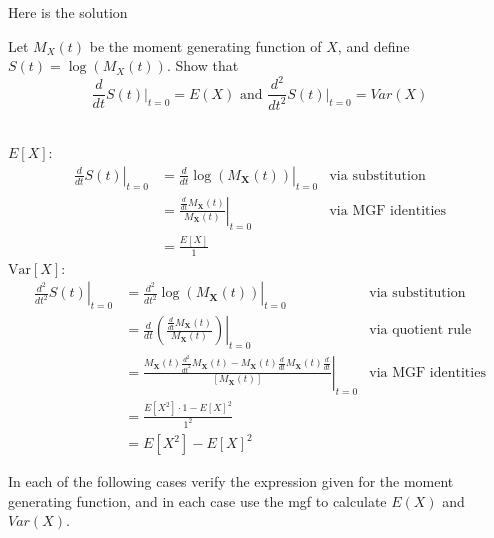 \documentclass[12pt,letterpaper]{exam}
\begin{document}
\begin{questions}
	
	\begin{solution}
		Here is the solution
	\end{solution}
	
	\setcounter{question}{31}
	\question  Let $M_X(t)$ be the moment generating function of $X$, and define $S(t) = \log{(M_X(t))}$. Show that
	$$ \frac{d}{dt} \left. S(t) \right|_{t=0} = E(X) \text{ and }  \frac{d^2}{dt^2} \left. S(t) \right|_{t=0} = Var(X)$$
	\begin{solution} \\
		\(E[X]\):
		\begin{align*}
			\left. \frac{d}{dt}S(t) \right|_{t=0} &= \left. \frac{d}{dt}\log(M_\mathbf{X}(t)) \right|_{t=0} &\text{via substitution}\\
			&= \left. \frac{\frac{d}{dt}M_\mathbf{X}(t)}{M_\mathbf{X}(t)} \right|_{t=0} &\text{via MGF identities} \\
			&= \frac{E[X]}{1}
		\end{align*}
		\(\text{Var}[X]\):
		\begin{align*}
			\left. \frac{d^2}{dt^2}S(t) \right|_{t=0} &= \left. \frac{d^2}{dt^2}\log(M_\mathbf{X}(t)) \right|_{t=0} &\text{via substitution}\\
			&= \left. \frac{d}{dt} \left( \frac{\frac{d}{dt}M_\mathbf{X}(t)}{M_\mathbf{X}(t)} \right) \right|_{t=0} &\text{via quotient rule} \\
			&= \left. \frac{
				M_\mathbf{X}(t)\frac{d^2}{dt^2} M_\mathbf{X}(t)-M_\mathbf{X}(t) \frac{d}{dt}M_\mathbf{X}(t) \frac{d}{dt} 
				}{ 
				\left[M_\mathbf{X}(t)\right] 
				} \right|_{t=0} &\text{via MGF identities} \\
			&= \frac{ E[X^2]\cdot1 - E[X]^2 }{ 1^2 } \\
			&= E[X^2] - E[X]^2
		\end{align*}
		
	\end{solution}
	
	\question  In each of the following cases verify the expression given for the moment generating function, and in each case use the mgf to calculate $E(X)$ and $Var(X)$.
	\begin{parts}

\end{parts}
\end{questions}
\end{document}
